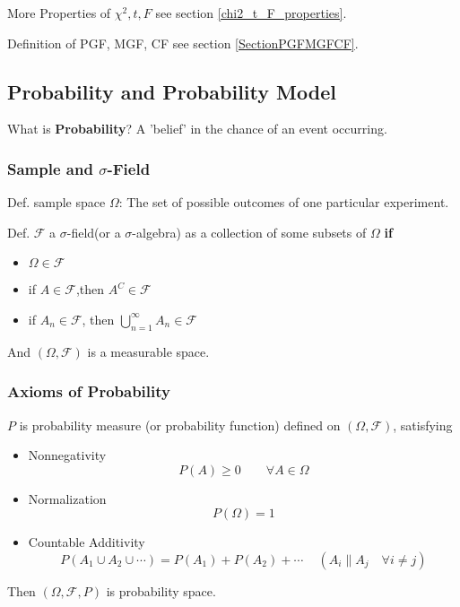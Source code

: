 \documentclass[11pt,a4paper]{ctexart}
\numberwithin{equation}{section}%
\begin{document}
    More Properties of $\chi^2,t,F$ see section \hyperref[chi2_t_F_properties]{\ref{chi2_t_F_properties}}.

    Definition of PGF, MGF, CF see section \hyperref[SectionPGFMGFCF]{\ref{SectionPGFMGFCF}}.

\subsection{Probability and Probability Model}
    What is \textbf{Probability}? A 'belief' in the chance of an event occurring.


\subsubsection{Sample and $\sigma$-Field}
    Def. sample space $\Omega$: The set of  possible outcomes of one particular experiment.

    Def. $\mathscr{F}$ a $\sigma$-field(or a $\sigma$-algebra) as a collection of some subsets of $\Omega$ \textbf{if}
    \begin{itemize}
        \item $\Omega\in\mathscr{F}$
        \item if $A\in\mathscr{F}$,then $A^C\in\mathscr{F}$
        \item if $A_n\in\mathscr{F}$, then ${\displaystyle\bigcup_{n=1}^\infty} A_n\in\mathscr{F}$
    \end{itemize}

    And $(\Omega,\mathscr{F})$ is a measurable space.
    
    
\subsubsection{Axioms of Probability}

    $P$ is probability measure (or probability function) defined on $(\Omega,\mathscr{F})$, satisfying

\begin{itemize}[itemsep=2pt,topsep=-2pt]
\item Nonnegativity
\[
    P(A)\geq 0\qquad \forall A\in\Omega    
\]
\item Normalization
\[
    P(\Omega)=1    
\]
\item Countable Additivity
\[
    P(A_1\cup A_2\cup\cdots)=P(A_1)+P(A_2)+\cdots\quad \, (A_i\parallel A_j\quad \forall i\neq j)
\]
\end{itemize}

    Then $(\Omega,\mathscr{F},P)$ is probability space.
\end{document}
